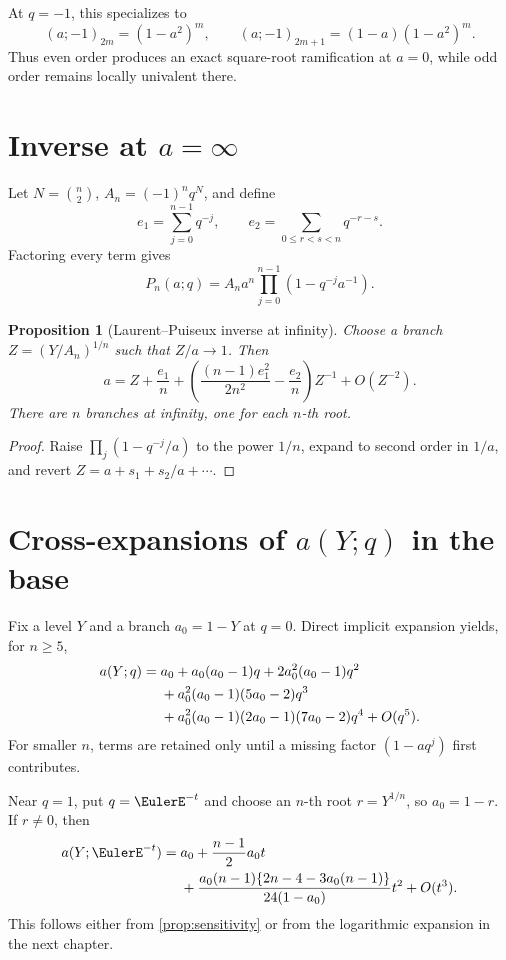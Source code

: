 \documentclass[11pt,a4paper,oneside,openany]{book}
\newtheorem{proposition}[theorem]{Proposition}
\theoremstyle{definition}
\theoremstyle{remark}
\begin{document}
At \(q=-1\), this specializes to
\[
 (a;-1)_{2m}=(1-a^2)^m,
 \qquad
 (a;-1)_{2m+1}=(1-a)(1-a^2)^m.
\]
Thus even order produces an exact square-root ramification at \(a=0\), while
odd order remains locally univalent there.

\section{Inverse at \texorpdfstring{$a=\infty$}{a=infinity}}

Let \(N=\binom n2\),
\(A_n=(-1)^nq^N\), and define
\[
 e_1=\sum_{j=0}^{n-1}q^{-j},\qquad
 e_2=\sum_{0\le r<s<n}q^{-r-s}.
\]
Factoring every term gives
\[
 P_n(a;q)=A_na^n\prod_{j=0}^{n-1}(1-q^{-j}a^{-1}).
\]

\begin{proposition}[Laurent--Puiseux inverse at infinity]
Choose a branch
\(Z=(Y/A_n)^{1/n}\) such that \(Z/a\to1\).  Then
\begin{equation}\label{eq:a-infinity-inverse}
 a=Z+\frac{e_1}{n}
 +\left(\frac{(n-1)e_1^2}{2n^2}-\frac{e_2}{n}\right)Z^{-1}
 +O(Z^{-2}).
\end{equation}
There are \(n\) branches at infinity, one for each \(n\)-th root.
\end{proposition}

\begin{proof}
Raise
\(\prod_j(1-q^{-j}/a)\) to the power \(1/n\), expand to second order in
\(1/a\), and revert \(Z=a+s_1+s_2/a+\cdots\).
\end{proof}

\section{Cross-expansions of \texorpdfstring{$a(Y;q)$}{a(Y;q)} in the base}

Fix a level \(Y\) and a branch \(a_0=1-Y\) at \(q=0\).  Direct implicit
expansion yields, for \(n\ge5\),
\begin{align}
 a(Y;q)={}&a_0+a_0(a_0-1)q+2a_0^2(a_0-1)q^2\notag\\
 &+a_0^2(a_0-1)(5a_0-2)q^3\notag\\
 &+a_0^2(a_0-1)(2a_0-1)(7a_0-2)q^4+O(q^5).
\label{eq:a-cross-q0}
\end{align}
For smaller \(n\), terms are retained only until a missing factor
\((1-aq^j)\) first contributes.

Near \(q=1\), put \(q=\EulerE^{-t}\) and choose an \(n\)-th root
\(r=Y^{1/n}\), so \(a_0=1-r\).  If \(r\ne0\), then
\begin{align}
 a(Y;\EulerE^{-t})={}&a_0+\frac{n-1}{2}a_0t\notag\\
 &+\frac{a_0(n-1)\{2n-4-3a_0(n-1)\}}
 {24(1-a_0)}t^2+O(t^3).
\label{eq:a-cross-q1}
\end{align}
This follows either from \cref{prop:sensitivity} or from the logarithmic
expansion in the next chapter.
\end{document}

